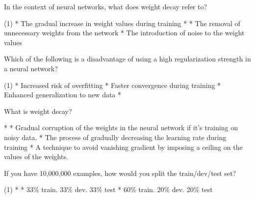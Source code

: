 \documentclass[10pt]{extarticle}
\begin{document}
\begin{exercise}
    In the context of neural networks, what does weight decay refer to?
    \begin{choice} (1)
        * The gradual increase in weight values during training
        * 
        * The removal of unnecessary weights from the network
        * The introduction of noise to the weight values
    \end{choice}
\end{exercise}
\begin{solution}
\end{solution}

\begin{exercise}
    Which of the following is a disadvantage of using a high regularization strength in a neural network?
    \begin{choice} (1)
        * Increased risk of overfitting
        * Faster convergence during training
        * Enhanced generalization to new data
        * 
    \end{choice}
\end{exercise}
\begin{solution}
\end{solution}

\begin{exercise}
    What is weight decay?
    \begin{choice}
        * 
        * Gradual corruption of the weights in the neural network if it's training on noisy data.
        * The process of gradually decreasing the learning rate during training
        * A technique to avoid vanishing gradient by imposing a ceiling on the values of the weights.
    \end{choice}
\end{exercise}
\begin{solution}
\end{solution}

\begin{exercise}
    If you have 10,000,000 examples, how would you split the train/dev/test set?
    \begin{choice}(1)
        * 
        * 33\% train. 33\% dev. 33\% test
        * 60\% train. 20\% dev. 20\% test
    \end{choice}
\end{exercise}
\begin{solution}
\end{solution}
\end{document}
